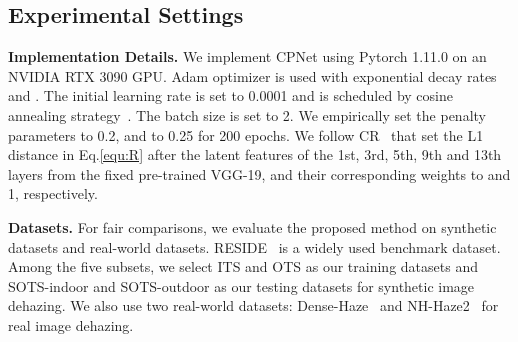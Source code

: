 \subsection{Experimental Settings}
\textbf{Implementation Details.} We implement CPNet using Pytorch 1.11.0 on an NVIDIA RTX 3090 GPU. Adam optimizer is used with exponential decay rates  and . The initial learning rate is set to 0.0001 and is scheduled by cosine annealing strategy~\cite{he2019bag}. The batch size is set to 2. We empirically set the penalty parameters  to 0.2, and  to 0.25 for 200 epochs. We follow CR~\cite{wu2021contrastive} that set the L1 distance in Eq.\eqref{equ:R} after the latent features of the 1st, 3rd, 5th, 9th and 13th layers from the fixed pre-trained VGG-19, and their corresponding weights  to  and 1, respectively.


\textbf{Datasets.} For fair comparisons, we evaluate the proposed method on synthetic datasets and real-world datasets. RESIDE~\cite{li2018benchmarking} is a widely used benchmark dataset. Among the five subsets, we select ITS and OTS as our training datasets and SOTS-indoor and SOTS-outdoor as our testing datasets for synthetic image dehazing. We also use two real-world datasets: Dense-Haze~\cite{ancuti2019dense} and NH-Haze2~\cite{ancuti2021ntire} for real image dehazing.


